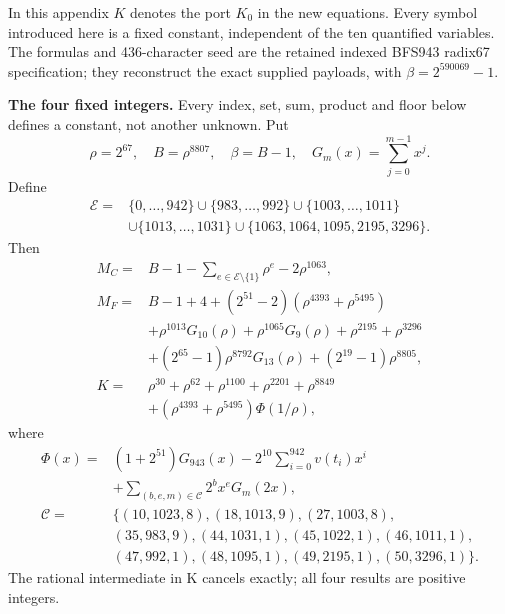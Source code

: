 \begingroup
\providecommand{\fl}[1]{\left\lfloor#1\right\rfloor}
\providecommand{\rg}[2]{\{#1,\ldots,#2\}}
In this appendix $K$ denotes the port $K_0$ in the new equations.
Every symbol introduced here is a fixed constant, independent of the ten
quantified variables. The formulas and 436-character seed are the retained
indexed BFS943 radix67 specification; they reconstruct the exact supplied
payloads, with $\beta=2^{590069}-1$.

\textbf{The four fixed integers.}
Every index, set, sum, product and floor below defines a constant, not
another unknown. Put
\[
\rho=2^{67},\quad B=\rho^{8807},\quad\beta=B-1,\quad
G_m(x)=\sum_{j=0}^{m-1}x^j.
\]
Define
\[
\begin{split}
\mathcal E={}&\rg0{942}\cup\rg{983}{992}\cup\rg{1003}{1011}\\
&\cup\rg{1013}{1031}\cup\{1063,1064,1095,2195,3296\}.
\end{split}
\]
Then
\begin{align*}
M_C={}&B-1-\sum_{e\in\mathcal E\setminus\{1\}}\rho^e-2\rho^{1063},\\
M_F={}&B-1+4+(2^{51}-2)(\rho^{4393}+\rho^{5495})\\
&+\rho^{1013}G_{10}(\rho)+\rho^{1065}G_9(\rho)
  +\rho^{2195}+\rho^{3296}\\
&+(2^{65}-1)\rho^{8792}G_{13}(\rho)+(2^{19}-1)\rho^{8805},\\
K={}&\rho^{30}+\rho^{62}+\rho^{1100}+\rho^{2201}+\rho^{8849}\\
&+(\rho^{4393}+\rho^{5495})\Phi(1/\rho),
\end{align*}
where
\[
\begin{split}
\Phi(x)={}&(1+2^{51})G_{943}(x)
 -2^{10}\sum_{i=0}^{942}v(t_i)x^i\\
&+\sum_{(b,e,m)\in\mathcal C}2^b x^e G_m(2x),\\
\mathcal C={}&\{(10,1023,8),(18,1013,9),(27,1003,8),\\
&(35,983,9),(44,1031,1),(45,1022,1),(46,1011,1),\\
&(47,992,1),(48,1095,1),(49,2195,1),(50,3296,1)\}.
\end{split}
\]
The rational intermediate in K cancels exactly; all four results are positive integers.

